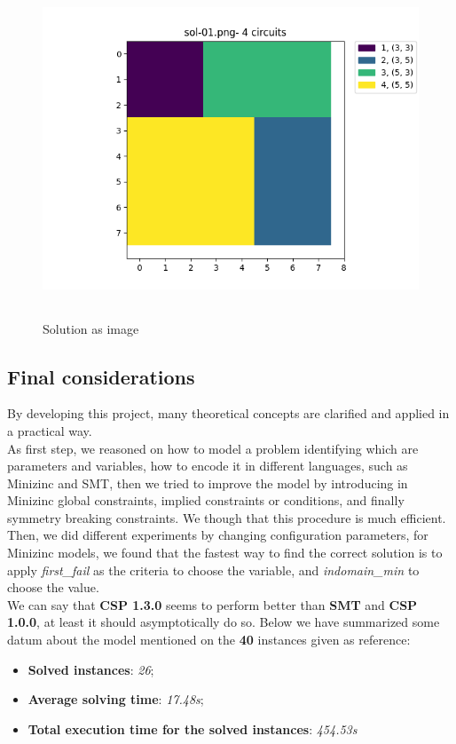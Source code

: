 \begin{figure}[!h]
 \centering
 \includegraphics[width=12cm, height=10cm]{images/sol-01.png}
 \caption{Solution as image}
 \label{fig:future}
\end{figure}

\subsection{Final considerations}
By developing this project, many theoretical concepts are clarified and applied in a practical way. \\
As first step, we reasoned on how to model a problem identifying which are parameters and variables, how to encode it in different languages, such as Minizinc and SMT, then we tried to improve the model by introducing in Minizinc global constraints, implied constraints or conditions, and finally symmetry breaking constraints. We though that this procedure is much efficient. \\
Then, we did different experiments by changing configuration parameters, for Minizinc models, we found that the fastest way to find the correct solution is to apply \emph{first\_fail} as the criteria to choose the variable, and \emph{indomain\_min} to choose the value.\\

We can say that \textbf{CSP 1.3.0} seems to perform better than \textbf{SMT} and \textbf{CSP 1.0.0}, at least it should asymptotically do so. Below we have summarized some datum about the model mentioned on the \textbf{40} instances given as reference:
\begin{itemize}
    \item \textbf{Solved instances}: \textit{26};
    \item \textbf{Average solving time}: \textit{17.48s};
    \item \textbf{Total execution time for the solved instances}: \textit{454.53s}
\end{itemize}
\clearpage